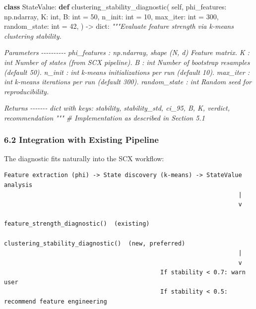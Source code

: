 \documentclass[
  12pt,
]{ctexart}
\newenvironment{Shaded}{}{}
\newcommand{\BuiltInTok}[1]{\textcolor[rgb]{0.00,0.50,0.00}{#1}}
\newcommand{\CommentTok}[1]{\textcolor[rgb]{0.38,0.63,0.69}{\textit{#1}}}
\newcommand{\DecValTok}[1]{\textcolor[rgb]{0.25,0.63,0.44}{#1}}
\newcommand{\KeywordTok}[1]{\textcolor[rgb]{0.00,0.44,0.13}{\textbf{#1}}}
\newcommand{\NormalTok}[1]{#1}
\newcommand{\OperatorTok}[1]{\textcolor[rgb]{0.40,0.40,0.40}{#1}}
\newcommand{\VariableTok}[1]{\textcolor[rgb]{0.10,0.09,0.49}{#1}}
\begin{document}
\begin{Shaded}
\begin{Highlighting}[]
\KeywordTok{class}\NormalTok{ StateValue:}
    \KeywordTok{def}\NormalTok{ clustering\_stability\_diagnostic(}
        \VariableTok{self}\NormalTok{,}
\NormalTok{        phi\_features: np.ndarray,}
\NormalTok{        K: }\BuiltInTok{int}\NormalTok{,}
\NormalTok{        B: }\BuiltInTok{int} \OperatorTok{=} \DecValTok{50}\NormalTok{,}
\NormalTok{        n\_init: }\BuiltInTok{int} \OperatorTok{=} \DecValTok{10}\NormalTok{,}
\NormalTok{        max\_iter: }\BuiltInTok{int} \OperatorTok{=} \DecValTok{300}\NormalTok{,}
\NormalTok{        random\_state: }\BuiltInTok{int} \OperatorTok{=} \DecValTok{42}\NormalTok{,}
\NormalTok{    ) }\OperatorTok{{-}\textgreater{}} \BuiltInTok{dict}\NormalTok{:}
        \CommentTok{"""Evaluate feature strength via k{-}means clustering stability.}

\CommentTok{        Parameters}
\CommentTok{        {-}{-}{-}{-}{-}{-}{-}{-}{-}{-}}
\CommentTok{        phi\_features : np.ndarray, shape (N, d)}
\CommentTok{            Feature matrix.}
\CommentTok{        K : int}
\CommentTok{            Number of states (from SCX pipeline).}
\CommentTok{        B : int}
\CommentTok{            Number of bootstrap resamples (default 50).}
\CommentTok{        n\_init : int}
\CommentTok{            k{-}means initializations per run (default 10).}
\CommentTok{        max\_iter : int}
\CommentTok{            k{-}means iterations per run (default 300).}
\CommentTok{        random\_state : int}
\CommentTok{            Random seed for reproducibility.}

\CommentTok{        Returns}
\CommentTok{        {-}{-}{-}{-}{-}{-}{-}}
\CommentTok{        dict with keys:}
\CommentTok{            stability, stability\_std, ci\_95, B, K, verdict, recommendation}
\CommentTok{        """}
        \CommentTok{\# Implementation as described in Section 5.1}
\end{Highlighting}
\end{Shaded}

\subsubsection{6.2 Integration with Existing
Pipeline}\label{integration-with-existing-pipeline}

The diagnostic fits naturally into the SCX workflow:

\begin{verbatim}
Feature extraction (phi) -> State discovery (k-means) -> StateValue analysis
                                                                  |
                                                                  v
                                            feature_strength_diagnostic()  (existing)
                                            clustering_stability_diagnostic()  (new, preferred)
                                                                  |
                                                                  v
                                            If stability < 0.7: warn user
                                            If stability < 0.5: recommend feature engineering
\end{verbatim}
\end{document}
